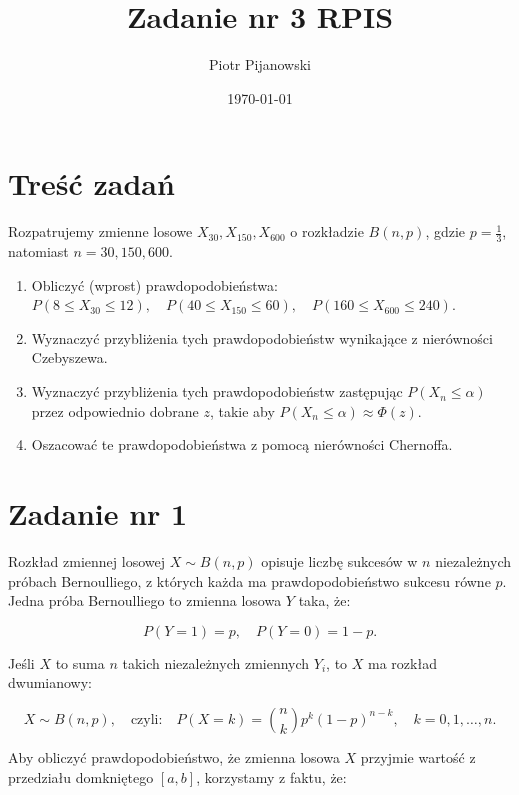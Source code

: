 \documentclass{article}
\title{Zadanie nr 3 RPIS}
\author{Piotr Pijanowski}
\date{\today}
\begin{document}
\maketitle

\section{Treść zadań}

Rozpatrujemy zmienne losowe \( X_{30}, X_{150}, X_{600} \) o rozkładzie \( B(n, p) \), gdzie \( p = \frac{1}{3} \), natomiast \( n = 30, 150, 600 \).

\begin{enumerate}
    \item Obliczyć (wprost) prawdopodobieństwa: \\
    \( P(8 \leq X_{30} \leq 12), \quad P(40 \leq X_{150} \leq 60), \quad P(160 \leq X_{600} \leq 240) \).
    
    \item Wyznaczyć przybliżenia tych prawdopodobieństw wynikające z nierówności Czebyszewa.
    
    \item Wyznaczyć przybliżenia tych prawdopodobieństw zastępując \( P(X_n \leq \alpha) \) przez odpowiednio dobrane \( z \), takie aby \( P(X_n \leq \alpha) \approx \Phi(z) \).
    
    \item Oszacować te prawdopodobieństwa z pomocą nierówności Chernoffa.
\end{enumerate}

\section{Zadanie nr 1}

Rozkład zmiennej losowej \( X \sim B(n, p) \) opisuje liczbę sukcesów w \( n \) niezależnych próbach Bernoulliego, z których każda ma prawdopodobieństwo sukcesu równe \( p \). Jedna próba Bernoulliego to zmienna losowa \( Y \) taka, że:

\[
P(Y = 1) = p, \quad P(Y = 0) = 1 - p.
\]

Jeśli \( X \) to suma \( n \) takich niezależnych zmiennych \( Y_i \), to \( X \) ma rozkład dwumianowy:

\[
X \sim B(n, p), \quad \text{czyli:} \quad P(X = k) = \binom{n}{k} p^k (1 - p)^{n - k}, \quad k = 0, 1, \dots, n.
\]

Aby obliczyć prawdopodobieństwo, że zmienna losowa \( X \) przyjmie wartość z przedziału domkniętego \( [a, b] \), korzystamy z faktu, że:
\end{document}
